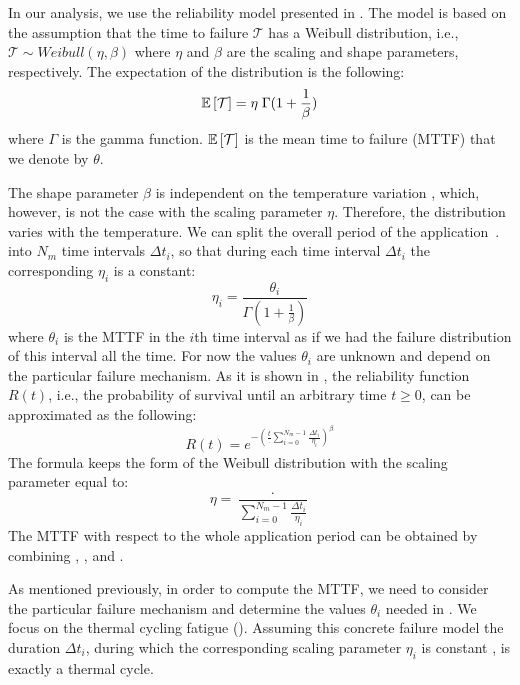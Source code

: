 In our analysis, we use the reliability model presented in \cite{huang2009, xiang2010}. The model is based on the assumption that the time to failure $\mathcal{T}$ has a Weibull distribution, i.e., $\mathcal{T} \sim Weibull(\eta, \beta)$ where $\eta$ and $\beta$ are the scaling and shape parameters, respectively. The expectation of the distribution is the following:
\begin{equation} \label{eq:general-mttf}
  \mathbb{E}\left[ \mathcal{T} \right] = \eta \; \Gamma(1 + \frac{1}{\beta})
\end{equation}
where $\Gamma$ is the gamma function. $\mathbb{E}\left[ \mathcal{T} \right]$ is the mean time to failure (MTTF) that we denote by $\theta$.

The shape parameter $\beta$ is independent on the temperature variation , which, however, is not the case with the scaling parameter $\eta$. Therefore, the distribution varies with the temperature. We can split the overall period of the application $\period$ into $N_m$ time intervals $\Delta t_i$, so that during each time interval $\Delta t_i$ the corresponding $\eta_i$ is a constant:
\begin{equation} \label{eq:eta-one}
  \eta_i = \frac{\theta_i}{\Gamma(1 + \frac{1}{\beta})}
\end{equation}
where $\theta_i$ is the MTTF in the $i$th time interval as if we had the failure distribution of this interval all the time. For now the values $\theta_i$ are unknown and depend on the particular failure mechanism. As it is shown in \cite{xiang2010}, the reliability function $R(t)$, i.e., the probability of survival until an arbitrary time $t \geq 0$, can be approximated as the following:
\[
  R(t) = e^{-(\frac{t}{\period} \sum_{i=0}^{N_m - 1} \frac{\Delta t_i}{\eta_i})^\beta}
\]
The formula keeps the form of the Weibull distribution with the scaling parameter equal to:
\begin{equation} \label{eq:eta-many}
  \eta = \frac{\period}{\sum_{i=0}^{N_m - 1} \frac{\Delta t_i}{\eta_i}}
\end{equation}
The MTTF with respect to the whole application period can be obtained by combining , , and .

As mentioned previously, in order to compute the MTTF, we need to consider the particular failure mechanism and determine the values $\theta_i$ needed in . We focus on the thermal cycling fatigue (). Assuming this concrete failure model the duration $\Delta t_i$, during which the corresponding scaling parameter $\eta_i$ is constant , is exactly a thermal cycle.

